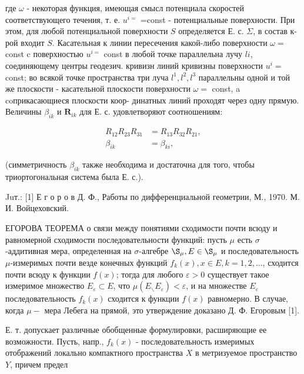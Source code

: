 \documentclass[10pt]{article}
\begin{document}
где $\omega$ - некоторая функция, имеющая смысл потенциала скоростей соответствующего течения, т. е. $u^{i=}$ =const - потенциальные поверхности. При этом, для любой потенциальной поверхности $S$ определяется Е. с. $\Sigma$, в состав к-рой входит $S$. Касательная к линии пересечения какой-либо поверхности $\omega=$ const c поверхностью $u^{i=}$ const в любой точке параллельна лучу $l i$, соединяющему центры геодезич. кривизн линий кривизны поверхности $u^{i}=$ const; во всякой точке пространства три луча $l^{1}, l^{2}, l^{3}$ параллельны одной и той же плоскости - касательной плоскости поверхности $\omega=$ const, a coприкасающиеся плоскости коор- динатных линий проходят через одну прямую. Величины $\beta_{i k}$ и $\boldsymbol{R}_{i k}$ для Е. с. удовлетворяют соотношениям:



\[

\begin{aligned}

R_{12} R_{23} R_{31} & =R_{13} R_{32} R_{21}, \\

\beta_{i k} & =\beta_{k i},

\end{aligned}

\]



(симметричность $\beta_{i k}$ также необходима и достаточна для того, чтобы триортогональная система была Е. с.).



Juт.: [1] Е г о р о в Д. Ф., Работы по дифференциальной геометрии, М., 1970. М. И. Войцеховский.



ЕГОРОВА ТЕОРЕМА о связи между понятиями сходимости почти всюду и равномерной сходимости последовательности функций: пусть $\mu$ есть $\sigma$-аддитивная мера, определенная на $\sigma$-алгебре $\S_{\mu}, E \in \S_{\mu}$ и последовательность $\mu$-измеримых почти везде конечных функций $f_{k}(x), x \in E, k=1,2, \ldots$, сходится почти всюду к функции $f(x)$; тогда для любого $\varepsilon>0$ существует такое измеримое множество $E_{\varepsilon} \subset E$, что $\mu\left(E_{\backslash} E_{\varepsilon}\right)<\varepsilon$, и на множестве $E_{\varepsilon}$ последовательность $f_{k}(x)$ сходится к функции $f(x)$ равномерно. В случае, когда $\mu-$ мера Лебега на прямой, это утверждение доказано Д. Ф. Егоровым [1].



Е. т. допускает различные обобщенные формулировки, расширяющие ее возможности. Пусть, напр., $f_{k}(x)$ - последовательность измеримых отображений локально компактного пространства $X$ в метризуемое пространство $Y$, причем предел
\end{document}
